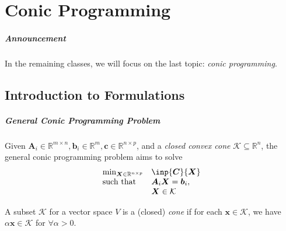 \chapter{Conic Programming}

\paragraph{Announcement}
In the remaining classes, we will focus on the last topic: \textit{conic programming}.

\section{Introduction to Formulations}

\paragraph{General Conic Programming Problem}
Given $\bm A_i\in\mathbb{R}^{m\times n},\bm b_i\in\mathbb{R}^m,\bm c\in\mathbb{R}^{n\times p}$, and a \emph{closed convex cone} $\mathcal{K}\subseteq\mathbb{R}^n$, the general conic programming problem aims to solve
\begin{equation}\label{Eq:13:1}
\begin{array}{ll}
\min_{\bm X\in\mathbb{R}^{n\times p}}&\inp{\bm C}{\bm X}\\
\mbox{such that}&\bm A_i\bm X=\bm b_i,\\
&\bm X\in\mathcal{K}
\end{array}
\end{equation}
\begin{definition}[Cone]
A subset $\mathcal{K}$ for a vector space $V$ is a (closed) \emph{cone} if for each $\bm x\in\mathcal{K}$, we have $\alpha\bm x\in\mathcal{K}$ for $\forall\alpha>0$.
\end{definition}

